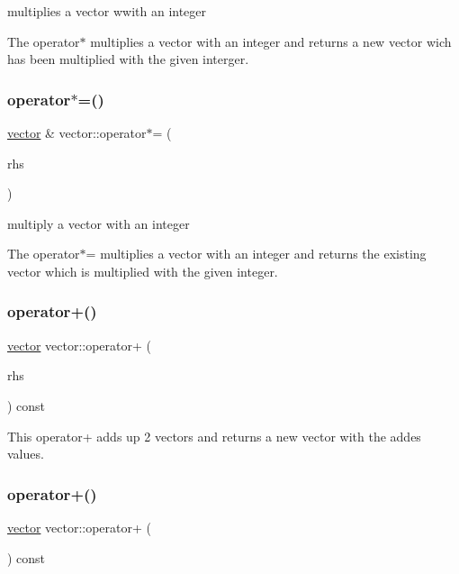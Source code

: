 multiplies a vector wwith an integer 

The operator$\ast$ multiplies a vector with an integer and returns a new vector wich has been multiplied with the given interger. \mbox{\label{classvector_a8bd821ebc5def1127712ff6b1c95b9ef}} 
\subsubsection{\texorpdfstring{operator$\ast$=()}{operator*=()}}
{\footnotesize\ttfamily \hyperlink{classvector}{vector} \& vector\+::operator$\ast$= (\begin{DoxyParamCaption}\item[{const int \&}]{rhs }\end{DoxyParamCaption})}



multiply a vector with an integer 

The operator$\ast$= multiplies a vector with an integer and returns the existing vector which is multiplied with the given integer. \mbox{\label{classvector_a9d639bc53d77f17c6ba3af1dd9549424}} 
\subsubsection{\texorpdfstring{operator+()}{operator+()}\hspace{0.1cm}{\footnotesize\ttfamily [1/2]}}
{\footnotesize\ttfamily \hyperlink{classvector}{vector} vector\+::operator+ (\begin{DoxyParamCaption}\item[{const \hyperlink{classvector}{vector} \&}]{rhs }\end{DoxyParamCaption}) const}

This operator+ adds up 2 vectors and returns a new vector with the addes values. \mbox{\label{classvector_a9af16b41f973cd073b089bf5371e8a70}} 
\subsubsection{\texorpdfstring{operator+()}{operator+()}\hspace{0.1cm}{\footnotesize\ttfamily [2/2]}}
{\footnotesize\ttfamily \hyperlink{classvector}{vector} vector\+::operator+ (\begin{DoxyParamCaption}{ }\end{DoxyParamCaption}) const}



